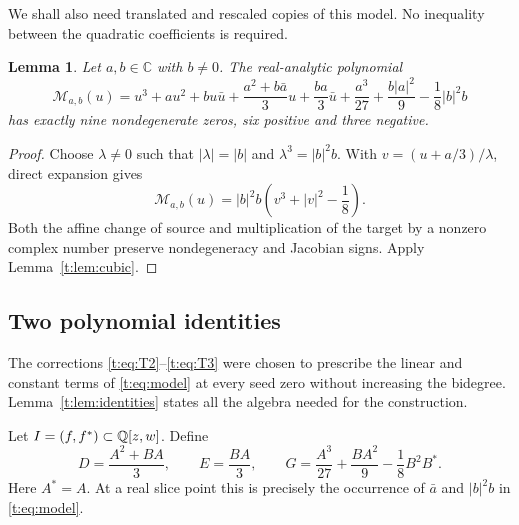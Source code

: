 \documentclass[UTF8,11pt]{ctexart}
\newtheorem{lem}[thm]{Lemma}
\theoremstyle{definition}
\numberwithin{equation}{section}
\newcommand{\C}{\mathbb C}\newcommand{\R}{\mathbb R}
\begin{document}
We shall also need translated and rescaled copies of this model. No
inequality between the quadratic coefficients is required.
\begin{lem}\label{t:lem:translated}
Let $a,b\in\C$ with $b\ne0$. The real-analytic polynomial
\begin{equation}\label{t:eq:model}
 \mathcal M_{a,b}(u)
 =u^3+au^2+bu\bar u
 +\frac{a^2+b\bar a}{3}u+\frac{ba}{3}\bar u
 +\frac{a^3}{27}+\frac{b|a|^2}{9}-\frac18|b|^2b
\end{equation}
has exactly nine nondegenerate zeros, six positive and three negative.
\end{lem}
\begin{proof}
Choose $\lambda\ne0$ such that $|\lambda|=|b|$ and
$\lambda^3=|b|^2b$. With $v=(u+a/3)/\lambda$, direct expansion gives
\[
 \mathcal M_{a,b}(u)=|b|^2b\left(v^3+|v|^2-\frac18\right).
\]
Both the affine change of source and multiplication of the target by
a nonzero complex number preserve nondegeneracy and Jacobian signs.
Apply Lemma~\ref{t:lem:cubic}.
\end{proof}

\subsection{Two polynomial identities}\label{t:sec:identities}

The corrections \eqref{t:eq:T2}--\eqref{t:eq:T3} were chosen to prescribe
the linear and constant terms of \eqref{t:eq:model} at every seed zero
without increasing the bidegree. Lemma~\ref{t:lem:identities} states all the algebra needed for the
construction.

Let $I=(f,f^*)\subset\mathbb Q[z,w]$. Define
\begin{equation}\label{t:eq:targetcoeffs}
 D=\frac{A^2+BA}{3},\qquad E=\frac{BA}{3},\qquad
 G=\frac{A^3}{27}+\frac{BA^2}{9}-\frac18B^2B^*.
\end{equation}
Here $A^*=A$. At a real slice point this is precisely the occurrence
of $\bar a$ and $|b|^2b$ in \eqref{t:eq:model}.
\end{document}
